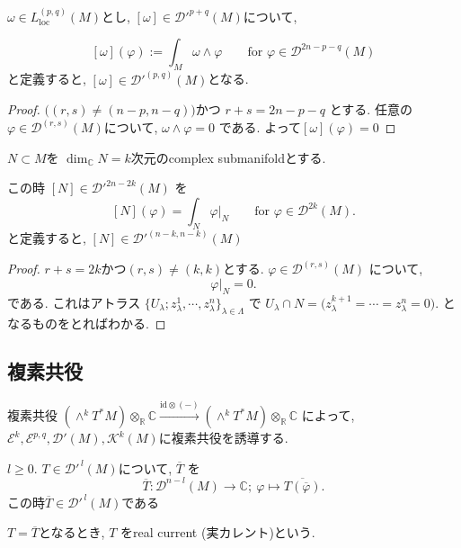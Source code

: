 \begin{ex}

 \( \omega \in L_{\mathrm{loc}}^{(p,q)}(M) \)とし, 
 \([ \omega ] \in \mathcal{D}'^{p+q}(M)\)について, 

\[
[\omega](\varphi):=\int_M \omega \wedge \varphi
\qquad \text{for } \varphi \in \mathcal{D}^{2n-p-q}(M)
\]
と定義すると, \([ \omega ] \in \mathcal{D}'^{(p,q)}(M)\)となる.

\begin{proof}
\(\bigl((r,s)\neq (n-p,n-q)\bigr)\)かつ
\( r+s=2n-p-q\)
とする. 任意の
\( \varphi \in \mathcal{D}^{(r,s)}(M) \)について, 
\(
\omega \wedge \varphi = 0
\)
である. よって$[\omega](\varphi)=0$
\end{proof}

\end{ex}


\begin{ex}
 \( N \subset M \)を \( \dim_{\mathbb{C}} N = k \)次元のcomplex submanifoldとする. 

この時 \([N] \in \mathcal{D}'^{2n-2k}(M)\) を
\[
[N](\varphi)=\int_N \varphi|_N
\qquad \text{for } \varphi \in \mathcal{D}^{2k}(M).
\]
と定義すると,  \([N] \in \mathcal{D}'^{(n-k,n-k)}(M)\)

\begin{proof}
\( r+s=2k \)かつ$(r,s)\neq (k,k)$とする. 
\( \varphi \in \mathcal{D}^{(r,s)}(M) \) について, 
\[
\varphi|_N = 0.
\]
である. 
これはアトラス \( \{U_\lambda; z_\lambda^1,\cdots,z_\lambda^n\}_{\lambda\in\Lambda} \)
で
\(
U_\lambda \cap N = \bigl( z_\lambda^{k+1}=\cdots=z_\lambda^n=0 \bigr).
\)
となるものをとればわかる. 
\end{proof}
\end{ex}

\subsection{複素共役}

複素共役
\( (\wedge^k T^*M) \otimes_{\mathbb{R}} \mathbb{C}
\overset{\text{id}\otimes(-)}{\longrightarrow}
(\wedge^k T^*M)\otimes_{\mathbb{R}} \mathbb{C} \)
によって, \( \mathcal{E}^k, \mathcal{E}^{p,q}, \mathcal{D}'(M), \mathcal{K}^k(M) \)に複素共役を誘導する. 

\begin{tcolorbox}[mybox]
\begin{defn}
\label{defn-M-4.2.1}
\( l\geq 0 \). \( T\in \mathcal{D}'^{\,l}(M) \)について, 
 \( \overline{T} \) を
\[
\overline{T}:\mathcal{D}^{n-l}(M)\to \mathbb{C};\ \varphi \mapsto \overline{T(\overline{\varphi})}.
\]
この時\( \overline{T}\in \mathcal{D}'^{\,l}(M) \)である

 \( T=\overline{T} \)となるとき, \( T \) をreal current (実カレント)という. 
\end{defn}
\end{tcolorbox}

